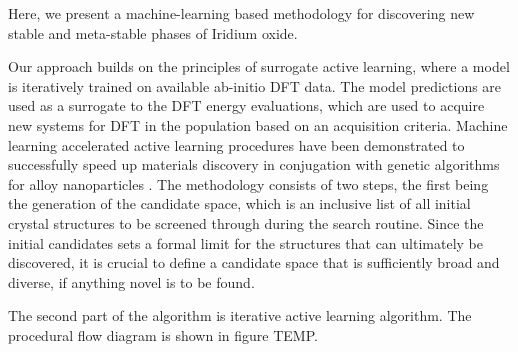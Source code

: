 


Here, we present a machine-learning based methodology for discovering new stable and meta-stable phases of Iridium oxide. 

Our approach builds on the principles of surrogate active learning, where a model is iteratively trained on available ab-initio DFT data. The model predictions are used as a surrogate to the DFT energy evaluations, which are used to acquire new systems for DFT in the population based on an acquisition criteria.
%
Machine learning accelerated active learning procedures have been demonstrated to successfully speed up materials discovery in conjugation with genetic algorithms for alloy nanoparticles \cite{Jennings2019, EXAMPLE_1, and EXAMPLE_2}.
The methodology consists of two steps, the first being the generation of the candidate space,
which is an inclusive list of all initial crystal structures to be screened through during the search routine. Since the initial candidates sets a formal limit for the structures that can ultimately be discovered, it is crucial to define a candidate space that is sufficiently broad and diverse, if anything novel is to be found.

%
The second part of the algorithm is iterative active learning algorithm.
The procedural flow diagram is shown in figure TEMP.

